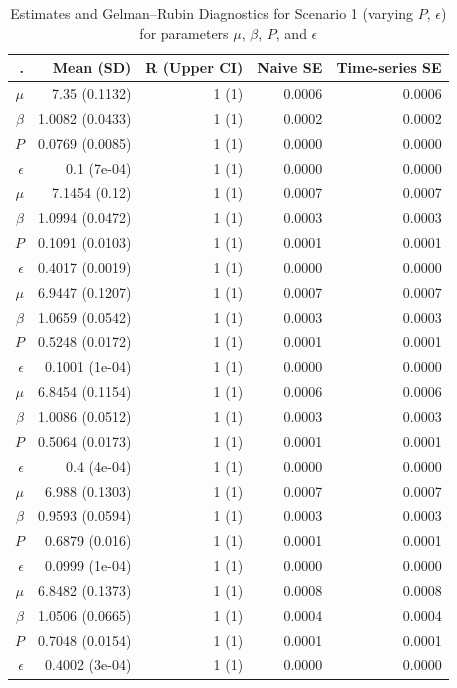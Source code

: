 \documentclass[
  letterpaper,
  double,
  12pt,
  1.0in]{beavtex}
\begin{document}
\begin{table}[ht]
\centering
\begin{tabular}{|r|r|r|r|r|}
  \hline
. & Mean (SD) & R (Upper CI) & Naive SE & Time-series SE \\ 
  \hline
$\mu$ & 7.35 (0.1132) & 1 (1) & 0.0006 & 0.0006 \\ 
  $\beta$ & 1.0082 (0.0433) & 1 (1) & 0.0002 & 0.0002 \\ 
  $P$ & 0.0769 (0.0085) & 1 (1) & 0.0000 & 0.0000 \\ 
  $\epsilon$ & 0.1 (7e-04) & 1 (1) & 0.0000 & 0.0000 \\ 
   \hline 
$\mu$ & 7.1454 (0.12) & 1 (1) & 0.0007 & 0.0007 \\ 
  $\beta$ & 1.0994 (0.0472) & 1 (1) & 0.0003 & 0.0003 \\ 
  $P$ & 0.1091 (0.0103) & 1 (1) & 0.0001 & 0.0001 \\ 
  $\epsilon$ & 0.4017 (0.0019) & 1 (1) & 0.0000 & 0.0000 \\ 
   \hline 
$\mu$ & 6.9447 (0.1207) & 1 (1) & 0.0007 & 0.0007 \\ 
  $\beta$ & 1.0659 (0.0542) & 1 (1) & 0.0003 & 0.0003 \\ 
  $P$ & 0.5248 (0.0172) & 1 (1) & 0.0001 & 0.0001 \\ 
  $\epsilon$ & 0.1001 (1e-04) & 1 (1) & 0.0000 & 0.0000 \\ 
   \hline 
$\mu$ & 6.8454 (0.1154) & 1 (1) & 0.0006 & 0.0006 \\ 
  $\beta$ & 1.0086 (0.0512) & 1 (1) & 0.0003 & 0.0003 \\ 
  $P$ & 0.5064 (0.0173) & 1 (1) & 0.0001 & 0.0001 \\ 
  $\epsilon$ & 0.4 (4e-04) & 1 (1) & 0.0000 & 0.0000 \\ 
   \hline 
$\mu$ & 6.988 (0.1303) & 1 (1) & 0.0007 & 0.0007 \\ 
  $\beta$ & 0.9593 (0.0594) & 1 (1) & 0.0003 & 0.0003 \\ 
  $P$ & 0.6879 (0.016) & 1 (1) & 0.0001 & 0.0001 \\ 
  $\epsilon$ & 0.0999 (1e-04) & 1 (1) & 0.0000 & 0.0000 \\ 
   \hline 
$\mu$ & 6.8482 (0.1373) & 1 (1) & 0.0008 & 0.0008 \\ 
  $\beta$ & 1.0506 (0.0665) & 1 (1) & 0.0004 & 0.0004 \\ 
  $P$ & 0.7048 (0.0154) & 1 (1) & 0.0001 & 0.0001 \\ 
  $\epsilon$ & 0.4002 (3e-04) & 1 (1) & 0.0000 & 0.0000 \\ 
   \hline
\end{tabular}
\caption{Estimates and Gelman--Rubin Diagnostics for Scenario 1 (varying $P$, $\epsilon$) for parameters $\mu$, $\beta$, $P$, and $\epsilon$} 
\end{table}
\end{document}
